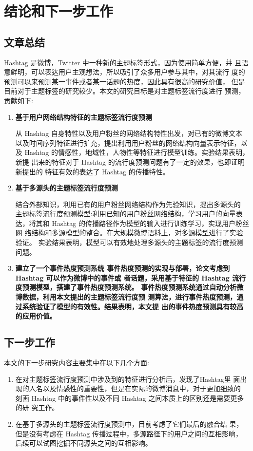 \chapter{结论和下一步工作}\label{chap:six}

\section{文章总结}

Hashtag 是微博，Twitter 中一种新的主题标签形式，因为使用简单方便，并 且语意鲜明，可以表达用户主观想法，所以吸引了众多用户参与其中，对其流行 度的预测可以来预测某一事件或者某一话题的热度，因此具有很高的研究价值， 但是目前对于主题标签的研究较少。本文的研究目标是对主题标签流行度进行 预测，贡献如下:
\begin{enumerate}
\item \bfseries 基于用户网络结构特征的主题标签流行度预测\mdseries 

从 Hashtag 自身特性以及用户粉丝的网络结构特性出发，对已有的微博文本 以及时间序列特征进行扩充，提出利用用户粉丝的网络结构向量表示特征，以及 Hashtag 的情感性，地域性，人物性等特征进行模型训练。实验结果表明，新提 出来的特征对于 Hashtag 的流行度预测问题有了一定的效果，也即证明新提出的 特征有效的表达了 Hashtag 的传播特性。

\item \bfseries 基于多源头的主题标签流行度预测 \mdseries 

结合外部知识，利用已有的用户粉丝网络结构作为先验知识，提出多源头的 主题标签流行度预测模型:利用已知的用户粉丝网络结构，学习用户的向量表 达，将其和 Hashtag 的传播路径作为模型的输入进行训练学习，实现用户粉丝网 络结构和多源模型的整合。在大规模微博语料上，对多源模型进行了实验验证。 实验结果表明，模型可以有效地处理多源头的主题标签的流行度预测问题。

\item  \bfseries 建立了一个事件热度预测系统 \mdseries 
事件热度预测的实现与部署，论文考虑到 Hashtag 可以作为微博中的事件或 者话题，采用基于特征的 Hashtag 流行度预测模型，搭建了事件热度预测系统。 事件热度预测系统通过自动分析微博数据，利用本文提出的主题标签流行度预 测算法，进行事件热度预测，通过系统验证了模型的有效性。结果表明，本文提 出的事件热度预测具有较高的应用价值。
\end{enumerate}

\section{下一步工作}

本文的下一步研究内容主要集中在以下几个方面:
\begin{enumerate}
\item  在对主题标签流行度预测中涉及到的特征进行分析后，发现了Hashtag里 面出现的人名以及情感性的重要性，但是在实际的微博消息中，对于更加细致的
 刻画 Hashtag 中的事件性以及不同 Hashtag 之间本质上的区别还是需要更多的研 究工作。
\item 在基于多源头的主题标签流行度预测中，目前考虑了它们最后的融合结 果，但是没有考虑在 Hashtag 传播过程中，多源路径下的用户之间的互相影响， 后续可以试图挖掘不同源头之间的互相影响。
\end{enumerate}